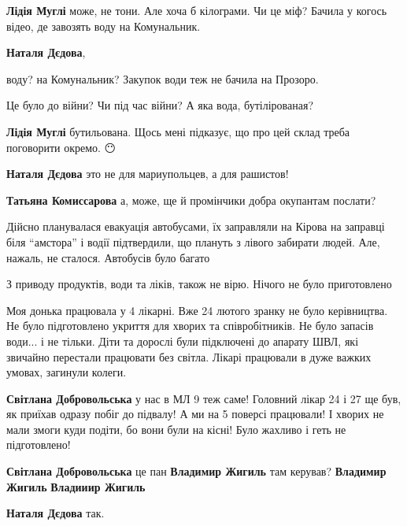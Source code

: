 \begin{itemize} %
\textbf{Лідія Муглі} може, не тони. Але хоча б кілограми. Чи це міф? Бачила у когось відео, де завозять воду на Комунальник.

\textbf{Наталя Дєдова}, 

воду? на Комунальник? Закупок води теж не бачила на Прозоро.

Це було до війни? Чи під час війни? А яка вода, бутілірованая?

\textbf{Лідія Муглі} бутильована. Щось мені підказує, що про цей склад треба поговорити окремо. 😶

\textbf{Наталя Дєдова} это не для мариупольцев, а для рашистов!
\end{itemize} %

\textbf{Татьяна Комиссарова} а, може, ще й промінчики добра окупантам послати?


Дійсно планувалася евакуація автобусами, їх заправляли на Кірова на заправці
біля \enquote{амстора} і водії підтвердили, що плануть з лівого забирати людей. Але,
нажаль, не сталося. Автобусів було багато


З приводу продуктів, води та ліків, також не вірю. Нічого не було приготовлено


Моя донька працювала у 4 лікарні. Вже 24 лютого зранку не було керівництва. Не
було підготовлено укриття для хворих та співробітників. Не було запасів
води... і не тільки. Діти та дорослі були підключені до апарату ШВЛ, які звичайно
перестали працювати без світла. Лікарі працювали в дуже важких умовах, загинули
колеги.

\begin{itemize} %
\textbf{Світлана Добровольська} у нас в МЛ 9 теж саме! Головний лікар 24 і 27 ще був, як приїхав одразу побіг до підвалу! А ми на 5 поверсі працювали! І хворих не мали змоги куди подіти, бо вони були на кісні! Було жахливо і геть не підготовлено!

\textbf{Світлана Добровольська} це пан \textbf{Владимир Жигиль} там керував? \textbf{Владимир Жигиль} \textbf{Владииир Жигиль}

\textbf{Наталя Дєдова} так.
\end{itemize} %

